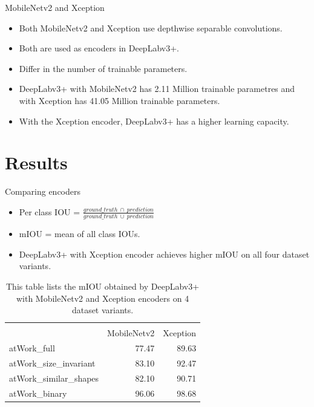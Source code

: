 \documentclass{beamer}
\begin{document}
\begin{frame}{MobileNetv2 and Xception}

	\begin{small}
		\begin{itemize}
			\item Both MobileNetv2 and Xception use depthwise separable convolutions.
			\item Both are used as encoders in DeepLabv3+.
			\item Differ in the number of trainable parameters.
			\item DeepLabv3+ with MobileNetv2 has 2.11 Million trainable parametres and with Xception has 41.05 Million trainable parameters.
			\item With the Xception encoder, DeepLabv3+ has a higher learning capacity.
		\end{itemize}
	\end{small}

\end{frame}


\section{Results}

\begin{frame}{Comparing encoders}
	\begin{small}
		\begin{itemize}
			\item 
		Per class IOU = $\frac{ground\_truth \: \cap \: prediction}{ground\_truth \: \cup \: prediction}$
			\item mIOU = mean of all class IOUs.
			\item DeepLabv3+ with Xception encoder achieves higher mIOU on all four dataset variants.
		\end{itemize}
	
		\begin{table}[h]
			\begin{tabular}{|l|r|r|}
			\hline
			\multicolumn{ 1}{|l|}{\makecell{\textbf{Dataset variant}}} & \multicolumn{ 2}{l|}{\makecell{\textbf{mIOU in \%}}} \\ \cline{ 2- 3}
			\multicolumn{ 1}{|l|}{} & \multicolumn{1}{l|}{MobileNetv2} & 			\multicolumn{1}{l|}{Xception} \\ \hline
			atWork\_full & 77.47 & 89.63 \\ \hline
			atWork\_size\_invariant & 83.10 & 92.47 \\ \hline
			atWork\_similar\_shapes & 82.10 & 90.71 \\ \hline
			atWork\_binary & 96.06 & 98.68 \\ \hline
			\end{tabular}
			\captionsetup{justification=centering,margin=2cm}
			\caption{This table lists the mIOU obtained by DeepLabv3+ with MobileNetv2 and Xception encoders on 4 dataset variants.} 
			\label{Table:vars}
		\end{table}
	\end{small}

\end{frame}
\end{document}

